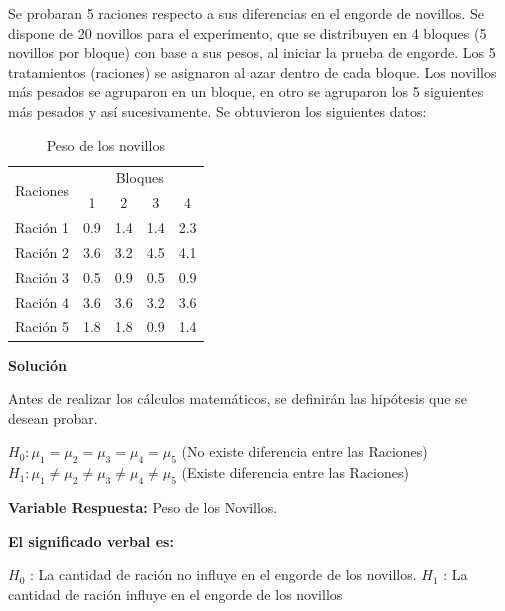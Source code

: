 \documentclass[12pt,letterpaper]{report}
\begin{document}
Se probaran 5 raciones respecto a sus diferencias en el engorde de novillos. Se dispone de 20
novillos para el experimento, que se distribuyen en 4 bloques (5 novillos por bloque) con base
a sus pesos, al iniciar la prueba de engorde. Los 5 tratamientos (raciones) se asignaron al azar
dentro de cada bloque. Los novillos más pesados se agruparon en un bloque, en otro se
agruparon los 5 siguientes más pesados y así sucesivamente. Se obtuvieron los siguientes
datos:

\begin{table}[htb]
\centering
\begin{tabular}{||c|c|c|c|c||}
\hline
\hline
\multirow{2}{*}{Raciones}  & \multicolumn{4}{|c||}{Bloques} \\
\cline{2-5}
     &1&2&3&4 \\
\hline
Ración 1 &0.9&1.4&1.4&2.3 \\
\hline
Ración 2 &3.6&3.2&4.5&4.1 \\
\hline
Ración 3 &0.5&0.9&0.5&0.9 \\
\hline
Ración 4 &3.6&3.6&3.2&3.6 \\
\hline
Ración 5 &1.8&1.8&0.9&1.4 \\
\hline
\hline

\end{tabular}
\caption{Peso de los novillos}
\end{table}

\textbf{Solución}

Antes de realizar los cálculos matemáticos, se definirán las hipótesis que se desean probar.

$H_0 : \mu_1 = \mu_2 = \mu_3 = \mu_4 = \mu_5$ (No existe diferencia entre las Raciones)
$H_1 : \mu_1 \not= \mu_2 \not= \mu_3 \not= \mu_4 \not= \mu_5$ (Existe diferencia entre las Raciones)

\textbf{Variable Respuesta:} Peso de los Novillos.

\textbf{El significado verbal es:}

$H_0$ : La cantidad de ración no influye en el engorde de los novillos.
$H_1$ : La cantidad de ración influye en el engorde de los novillos


\begin{Schunk}
\end{Schunk}
\end{document}

